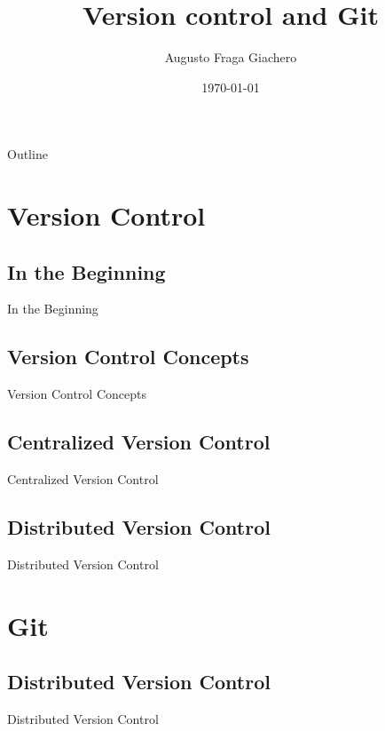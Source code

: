 \documentclass{beamer}
\title{Version control and Git}
\author{Augusto Fraga Giachero}
\date{\today}
\begin{document}
\begin{frame}
    \titlepage 
\end{frame}

\begin{frame}{Outline}
    \tableofcontents
\end{frame}

\section{Version Control}

\subsection{In the Beginning}
\begin{frame}{In the Beginning}
\end{frame}

\subsection{Version Control Concepts}
\begin{frame}{Version Control Concepts}
\end{frame}

\subsection{Centralized Version Control}
\begin{frame}{Centralized Version Control}
\end{frame}

\subsection{Distributed Version Control}
\begin{frame}{Distributed Version Control}
\end{frame}

\section{Git}

\subsection{Distributed Version Control}
\begin{frame}{Distributed Version Control}
\end{frame} 
\end{document}
